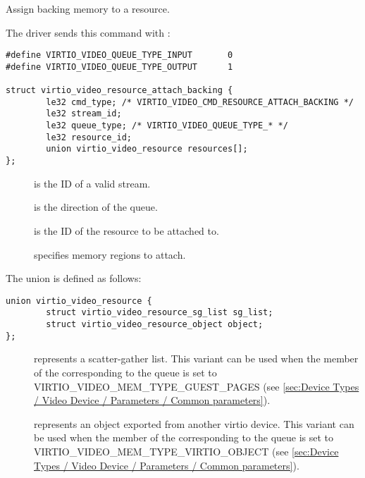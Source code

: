 Assign backing memory to a resource.

The driver sends this command with
:

\begin{lstlisting}
#define VIRTIO_VIDEO_QUEUE_TYPE_INPUT       0
#define VIRTIO_VIDEO_QUEUE_TYPE_OUTPUT      1

struct virtio_video_resource_attach_backing {
        le32 cmd_type; /* VIRTIO_VIDEO_CMD_RESOURCE_ATTACH_BACKING */
        le32 stream_id;
        le32 queue_type; /* VIRTIO_VIDEO_QUEUE_TYPE_* */
        le32 resource_id;
        union virtio_video_resource resources[];
};
\end{lstlisting}

\begin{description}
\item[]
is the ID of a valid stream.
\item[]
is the direction of the queue.
\item[]
is the ID of the resource to be attached to.
\item[]
specifies memory regions to attach.
\end{description}

The union  is defined as follows:

\begin{lstlisting}
union virtio_video_resource {
        struct virtio_video_resource_sg_list sg_list;
        struct virtio_video_resource_object object;
};
\end{lstlisting}

\begin{description}
\item[]
represents a scatter-gather list. This variant can be used when the
 member of the 
corresponding to the queue is set to
VIRTIO\_VIDEO\_MEM\_TYPE\_GUEST\_PAGES (see
\ref{sec:Device Types / Video Device / Parameters / Common parameters}).
\item[]
represents an object exported from another virtio device. This variant
can be used when the  member of the
 corresponding to the queue is set
to VIRTIO\_VIDEO\_MEM\_TYPE\_VIRTIO\_OBJECT (see
\ref{sec:Device Types / Video Device / Parameters / Common parameters}).
\end{description}

